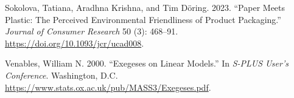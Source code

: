 \documentclass[
  11pt,
  letterpaper,
]{scrbook}
\newlength{\cslhangindent}
\newenvironment{CSLReferences}[2] %
 {\begin{list}{}{%
  \setlength{\itemindent}{0pt}
  \setlength{\leftmargin}{0pt}
  \setlength{\parsep}{0pt}
  \ifodd #1
   \setlength{\leftmargin}{\cslhangindent}
   \setlength{\itemindent}{-1\cslhangindent}
  \fi
  \setlength{\itemsep}{#2\baselineskip}}}
 {\end{list}}
\theoremstyle{plain}
\theoremstyle{plain}
\theoremstyle{definition}
\theoremstyle{definition}
\theoremstyle{remark}
\begin{document}
\begin{CSLReferences}{1}{0}
Sokolova, Tatiana, Aradhna Krishna, and Tim Döring. 2023. {``Paper Meets
Plastic: The Perceived Environmental Friendliness of Product
Packaging.''} \emph{Journal of Consumer Research} 50 (3): 468--91.
\url{https://doi.org/10.1093/jcr/ucad008}.

Venables, William N. 2000. {``Exegeses on Linear Models.''} In
\emph{S-PLUS User's Conference}. Washington, D.C.
\url{https://www.stats.ox.ac.uk/pub/MASS3/Exegeses.pdf}.

\end{CSLReferences}


\backmatter
\end{document}
